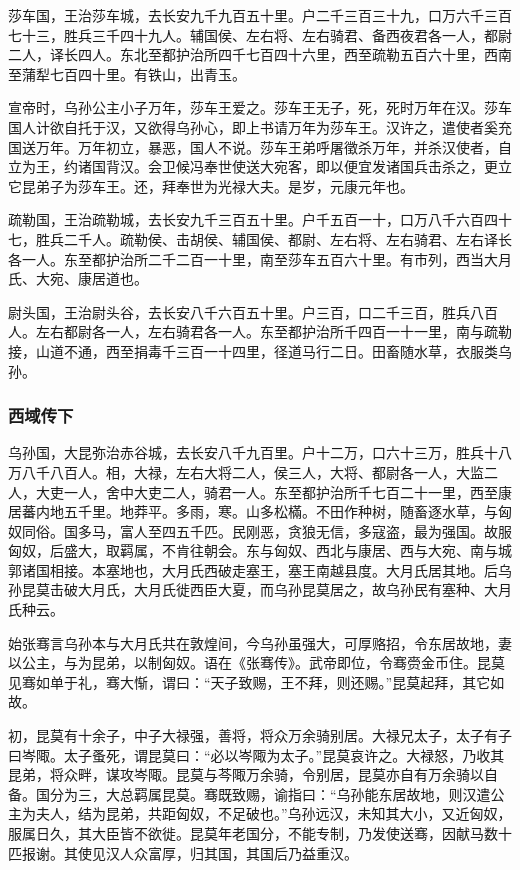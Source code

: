 \documentclass[]{article}
\begin{document}
莎车国，王治莎车城，去长安九千九百五十里。户二千三百三十九，口万六千三百七十三，胜兵三千四十九人。辅国侯、左右将、左右骑君、备西夜君各一人，都尉二人，译长四人。东北至都护治所四千七百四十六里，西至疏勒五百六十里，西南至蒲犁七百四十里。有铁山，出青玉。

宣帝时，乌孙公主小子万年，莎车王爱之。莎车王无子，死，死时万年在汉。莎车国人计欲自托于汉，又欲得乌孙心，即上书请万年为莎车王。汉许之，遣使者奚充国送万年。万年初立，暴恶，国人不说。莎车王弟呼屠徵杀万年，并杀汉使者，自立为王，约诸国背汉。会卫候冯奉世使送大宛客，即以便宜发诸国兵击杀之，更立它昆弟子为莎车王。还，拜奉世为光禄大夫。是岁，元康元年也。

疏勒国，王治疏勒城，去长安九千三百五十里。户千五百一十，口万八千六百四十七，胜兵二千人。疏勒侯、击胡侯、辅国侯、都尉、左右将、左右骑君、左右译长各一人。东至都护治所二千二百一十里，南至莎车五百六十里。有市列，西当大月氏、大宛、康居道也。

尉头国，王治尉头谷，去长安八千六百五十里。户三百，口二千三百，胜兵八百人。左右都尉各一人，左右骑君各一人。东至都护治所千四百一十一里，南与疏勒接，山道不通，西至捐毒千三百一十四里，径道马行二日。田畜随水草，衣服类乌孙。

\hypertarget{header-n6426}{%
\subsubsection{西域传下}\label{header-n6426}}

乌孙国，大昆弥治赤谷城，去长安八千九百里。户十二万，口六十三万，胜兵十八万八千八百人。相，大禄，左右大将二人，侯三人，大将、都尉各一人，大监二人，大吏一人，舍中大吏二人，骑君一人。东至都护治所千七百二十一里，西至康居蕃内地五千里。地莽平。多雨，寒。山多松樠。不田作种树，随畜逐水草，与匈奴同俗。国多马，富人至四五千匹。民刚恶，贪狼无信，多寇盗，最为强国。故服匈奴，后盛大，取羁属，不肯往朝会。东与匈奴、西北与康居、西与大宛、南与城郭诸国相接。本塞地也，大月氏西破走塞王，塞王南越县度。大月氏居其地。后乌孙昆莫击破大月氏，大月氏徙西臣大夏，而乌孙昆莫居之，故乌孙民有塞种、大月氏种云。

始张骞言乌孙本与大月氏共在敦煌间，今乌孙虽强大，可厚赂招，令东居故地，妻以公主，与为昆弟，以制匈奴。语在《张骞传》。武帝即位，令骞赍金币住。昆莫见骞如单于礼，骞大惭，谓曰：``天子致赐，王不拜，则还赐。''昆莫起拜，其它如故。

初，昆莫有十余子，中子大禄强，善将，将众万余骑别居。大禄兄太子，太子有子曰岑陬。太子蚤死，谓昆莫曰：``必以岑陬为太子。''昆莫哀许之。大禄怒，乃收其昆弟，将众畔，谋攻岑陬。昆莫与芩陬万余骑，令别居，昆莫亦自有万余骑以自备。国分为三，大总羁属昆莫。骞既致赐，谕指曰：``乌孙能东居故地，则汉遣公主为夫人，结为昆弟，共距匈奴，不足破也。''乌孙远汉，未知其大小，又近匈奴，服属日久，其大臣皆不欲徙。昆莫年老国分，不能专制，乃发使送骞，因献马数十匹报谢。其使见汉人众富厚，归其国，其国后乃益重汉。
\end{document}
